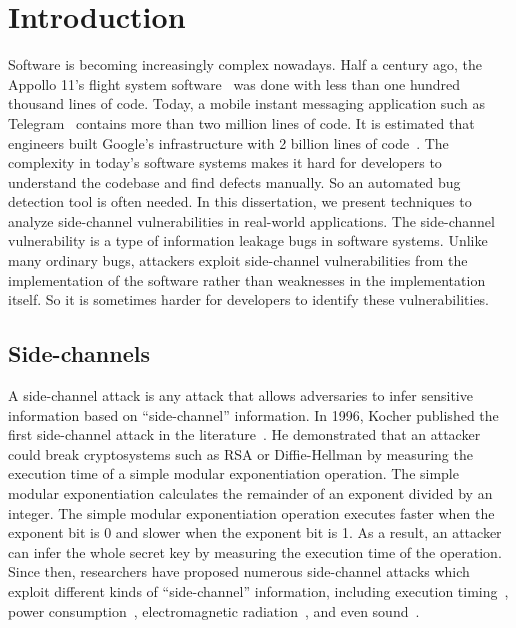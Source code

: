 
\chapter{Introduction} \label{chapter1}
Software is becoming increasingly complex nowadays. Half a century ago, the Appollo 11's flight system software~\cite{hamilton19690apollo} was done with less than one hundred thousand lines of code. 
Today, a mobile instant messaging application such as Telegram~\cite{telegram} contains more than two million lines of code. It is estimated that engineers built Google's infrastructure with 2 billion lines of code~\cite{potvin2016google}. The complexity in today's software systems makes it hard for developers to understand the codebase and find defects manually. So an automated bug detection tool is often needed. In this dissertation, we present techniques to analyze side-channel vulnerabilities in real-world applications. The side-channel vulnerability is a type of information leakage bugs in software systems. Unlike many ordinary bugs, attackers exploit side-channel vulnerabilities from the implementation of the software rather than weaknesses in the implementation itself. So it is sometimes harder for developers to identify these vulnerabilities.

\section{Side-channels}
A side-channel attack is any attack that allows adversaries to infer sensitive information based on ``side-channel'' information. In 1996, Kocher published the first side-channel attack in the literature~\cite{kocher1996timing}. He demonstrated that an attacker could break cryptosystems such as RSA or Diffie-Hellman by measuring the execution time of a simple modular exponentiation operation. The simple modular exponentiation calculates the remainder of an exponent divided by an integer.  The simple modular exponentiation operation executes faster when the exponent bit is 0 and slower when the exponent bit is 1. As a result, an attacker can infer the whole secret key by measuring the execution time of the operation. Since then, researchers have proposed numerous side-channel attacks which exploit different kinds of ``side-channel'' information, including execution timing~\cite{184415,disselkoen2017prime+,7163050}, power consumption~\cite{kar20178}, electromagnetic radiation~\cite{agrawal2002side,217605}, and even sound~\cite{chari1999towards}. 

